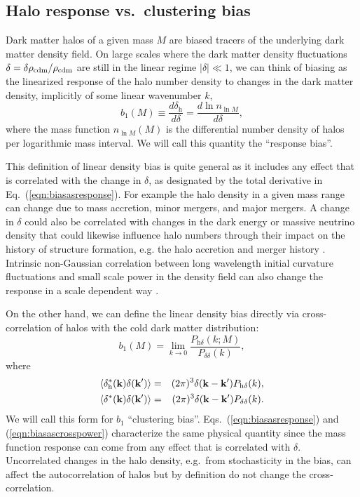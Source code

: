 \documentclass[prd,twocolumn,amsmath,amssymb,floatfix,superscriptaddress]{revtex4-1}
\newcommand{\lnM}{{\ln\!M}}
\begin{document}
\subsection{Halo response vs.~clustering bias}

Dark matter halos of a given mass $M$
are biased tracers of the underlying dark matter density field.   On large scales where
the dark matter density fluctuations $\delta = \delta\rho_{\rm cdm}/\rho_{\rm cdm}$ are still in the linear regime  
$|\delta| \ll 1$, we can think of biasing as the linearized response of the halo number density to changes in the 
dark matter density, implicitly of some linear wavenumber $k$,
%
\begin{equation}
    b_1(M) \equiv \frac{d \delta_\textrm{h}}{d \delta}
    = \frac{d \ln n_\lnM}{d \delta} ,
\label{eqn:biasasresponse}
\end{equation}
%
where the mass function $n_\lnM(M)$ is the differential number density of halos per
logarithmic mass interval.   We will call this quantity the ``response bias''.


This definition of linear density bias is quite general
as it includes any effect that is correlated with the change in $\delta$, as designated
by the total derivative in Eq.~(\ref{eqn:biasasresponse}).   For example the halo density in a
given mass range can change due to mass accretion, minor mergers, and
major mergers.
A change in $\delta$ 
could also be correlated with changes in the dark energy or massive neutrino density that could likewise
influence halo numbers through their impact on the history of structure
formation, e.g. the halo accretion and merger history \cite{ShethTormen:04,Wechsleretal:06,Dalaletal:08b,IchikiTakada:12,LoVerde:14}.
Intrinsic
non-Gaussian correlation between long wavelength initial curvature
fluctuations and small scale power in the density field can also change
the response in a scale dependent way
\cite{Dalaletal:08}.

On the other hand, we can define the linear density bias directly via cross-correlation of
halos with the cold dark matter distribution:
%
\begin{equation}
    b_1(M) = \lim_{k\rightarrow 0}\frac{P_{\textrm{h}\delta}(k;M)}{P_{\delta\delta}(k)},
    \label{eqn:biasascrosspower}
\end{equation}
%
where
\begin{eqnarray}
    \langle \delta_\textrm{h}^*({\bf k}) \delta({\bf k}') \rangle &=& (2\pi)^3 \delta({\bf k}-{\bf k}') P_{\textrm{h}\delta}(k) ,\nonumber\\
\langle \delta^*({\bf k}) \delta({\bf k}') \rangle &=& (2\pi)^3 \delta({\bf k}-{\bf k}') P_{\delta\delta}(k).
\end{eqnarray}
%
We will call this form for $b_1$ ``clustering bias''.  Eqs.~(\ref{eqn:biasasresponse})
and (\ref{eqn:biasascrosspower}) characterize the same physical quantity since 
 the mass function response can come from any effect
that is correlated with $\delta$.
Uncorrelated changes in the halo density, e.g.~from stochasticity in the
bias, can affect the autocorrelation of halos but by definition do not
change the cross-correlation.
\end{document}
